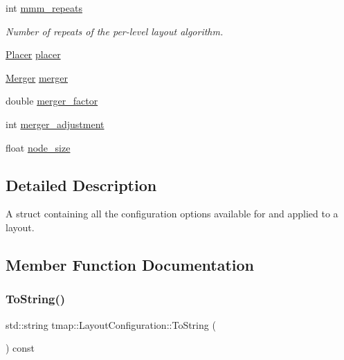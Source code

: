 \begin{DoxyCompactItemize}
int \hyperlink{structtmap_1_1LayoutConfiguration_aff2347eb71c98bbc72f16b4de32d4af0}{mmm\+\_\+repeats}
\begin{DoxyCompactList}\small\item\em Number of repeats of the per-\/level layout algorithm. \end{DoxyCompactList}\item 
\hyperlink{layout_8hh_afdc98947e81dc6f4c30f256e6f42f90b}{Placer} \hyperlink{structtmap_1_1LayoutConfiguration_ae81108ee33f42b2c084b540f902bbb7d}{placer}
\item 
\hyperlink{layout_8hh_a8c7bb9956a1a724233182a166cfdc0ff}{Merger} \hyperlink{structtmap_1_1LayoutConfiguration_aeee45308fd8dbda38fbc7b8c7ff9212f}{merger}
\item 
double \hyperlink{structtmap_1_1LayoutConfiguration_a72fe4f8f738d2d400f70db97c4273a46}{merger\+\_\+factor}
\item 
int \hyperlink{structtmap_1_1LayoutConfiguration_a16109420c8ec0a4c3021345fd943daf6}{merger\+\_\+adjustment}
\item 
float \hyperlink{structtmap_1_1LayoutConfiguration_a9a97e2c0c9edb212190d3afcc3ce2924}{node\+\_\+size}
\end{DoxyCompactItemize}


\subsection{Detailed Description}
A struct containing all the configuration options available for and applied to a layout. 

\subsection{Member Function Documentation}
\mbox{\label{structtmap_1_1LayoutConfiguration_a498341508ea4806795f44e376af18e11}} 
\subsubsection{\texorpdfstring{To\+String()}{ToString()}}
{\footnotesize\ttfamily std\+::string tmap\+::\+Layout\+Configuration\+::\+To\+String (\begin{DoxyParamCaption}{ }\end{DoxyParamCaption}) const\hspace{0.3cm}{\ttfamily [inline]}}



